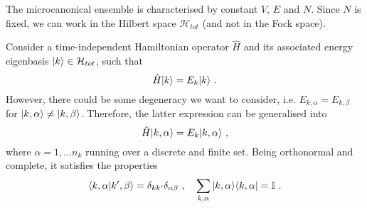     The microcanonical ensemble is characterised by constant $V$, $E$ and $N$. Since $N$ is fixed, we can work in the Hilbert space $\mathcal H_{tot}$ (and not in the Fock space). 
    
    Consider a time-independent Hamiltonian operator $\hat H$ and its associated energy eigenbasis $\vert k\rangle \in \mathcal H_{tot}$, such that
    \begin{equation*}
        \hat H \vert k\rangle = E_k \vert k\rangle ~.
    \end{equation*}
    However, there could be some degeneracy we want to consider, i.e. $E_{k,\alpha} = E_{k, \beta}$ for $\vert k, \alpha\rangle \neq \vert k, \beta\rangle$. Therefore, the latter expression can be generalised into
    \begin{equation}\label{eneigen}
        \hat H \vert k,\alpha\rangle = E_k \vert k,\alpha\rangle ~,
    \end{equation}
    where $\alpha = 1, \ldots n_k$ running over a discrete and finite set. Being orthonormal and complete, it satisfies the properties 
    \begin{equation*}
        \langle k, \alpha\vert k', \beta\rangle = \delta_{kk'} \delta_{\alpha\beta} ~, \quad \sum_{k, \alpha} \vert k,\alpha\rangle \langle k,\alpha\vert = \mathbb I ~.
    \end{equation*}

